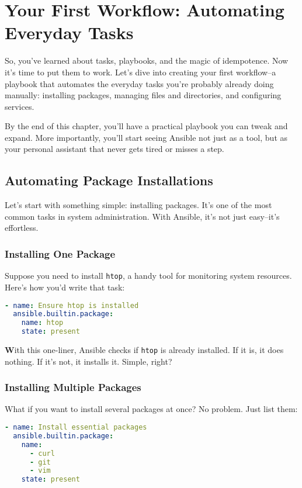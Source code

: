 \chapter{Your First Workflow: Automating Everyday Tasks}

So, you've learned about tasks, playbooks, and the magic of idempotence. Now it's time to put them to work. Let's dive into creating your first workflow--a playbook that automates the everyday tasks you're probably already doing manually: installing packages, managing files and directories, and configuring services.

By the end of this chapter, you'll have a practical playbook you can tweak and expand. More importantly, you'll start seeing Ansible not just as a tool, but as your personal assistant that never gets tired or misses a step.

\section{Automating Package Installations}

Let's start with something simple: installing packages. It's one of the most common tasks in system administration. With Ansible, it's not just easy--it's effortless.

\subsection{Installing One Package}

Suppose you need to install \texttt{htop}, a handy tool for monitoring system resources. Here's how you'd write that task:
\begin{lstlisting}[language=yaml, caption=Installing a Single Package]
- name: Ensure htop is installed
  ansible.builtin.package:
    name: htop
    state: present
\end{lstlisting}

\textbf{W}ith this one-liner, Ansible checks if \texttt{htop} is already installed. If it is, it does nothing. If it's not, it installs it. Simple, right?

\subsection{Installing Multiple Packages}

What if you want to install several packages at once? No problem. Just list them:
\begin{lstlisting}[language=yaml, caption=Installing Multiple Packages]
- name: Install essential packages
  ansible.builtin.package:
    name:
      - curl
      - git
      - vim
    state: present
\end{lstlisting}

